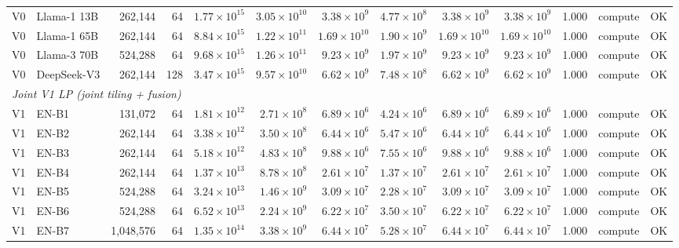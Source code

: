 \begin{table}[ht!]
{\begin{tabular}{llrrrrrrrrrll}
V0 & Llama-1 13B & 262{,}144 &  64 & $1.77\times10^{15}$ & $3.05\times10^{10}$ & $3.38\times10^{9}$ & $4.77\times10^{8}$ & $3.38\times10^{9}$ & $3.38\times10^{9}$ & 1.000 & compute & OK \\
V0 & Llama-1 65B & 262{,}144 &  64 & $8.84\times10^{15}$ & $1.22\times10^{11}$ & $1.69\times10^{10}$& $1.90\times10^{9}$ & $1.69\times10^{10}$& $1.69\times10^{10}$& 1.000 & compute & OK \\
V0 & Llama-3 70B & 524{,}288 &  64 & $9.68\times10^{15}$ & $1.26\times10^{11}$ & $9.23\times10^{9}$ & $1.97\times10^{9}$ & $9.23\times10^{9}$ & $9.23\times10^{9}$ & 1.000 & compute & OK \\
V0 & DeepSeek-V3 & 262{,}144 & 128 & $3.47\times10^{15}$ & $9.57\times10^{10}$ & $6.62\times10^{9}$ & $7.48\times10^{8}$ & $6.62\times10^{9}$ & $6.62\times10^{9}$ & 1.000 & compute & OK \\
\midrule
\multicolumn{13}{l}{\textit{Joint V1 LP (joint tiling + fusion)}} \\
\midrule
V1 & EN-B1       &    131{,}072 &  64 & $1.81\times10^{12}$ & $2.71\times10^{8}$  & $6.89\times10^{6}$ & $4.24\times10^{6}$ & $6.89\times10^{6}$ & $6.89\times10^{6}$ & 1.000 & compute & OK \\
V1 & EN-B2       &    262{,}144 &  64 & $3.38\times10^{12}$ & $3.50\times10^{8}$  & $6.44\times10^{6}$ & $5.47\times10^{6}$ & $6.44\times10^{6}$ & $6.44\times10^{6}$ & 1.000 & compute & OK \\
V1 & EN-B3       &    262{,}144 &  64 & $5.18\times10^{12}$ & $4.83\times10^{8}$  & $9.88\times10^{6}$ & $7.55\times10^{6}$ & $9.88\times10^{6}$ & $9.88\times10^{6}$ & 1.000 & compute & OK \\
V1 & EN-B4       &    262{,}144 &  64 & $1.37\times10^{13}$ & $8.78\times10^{8}$  & $2.61\times10^{7}$ & $1.37\times10^{7}$ & $2.61\times10^{7}$ & $2.61\times10^{7}$ & 1.000 & compute & OK \\
V1 & EN-B5       &    524{,}288 &  64 & $3.24\times10^{13}$ & $1.46\times10^{9}$  & $3.09\times10^{7}$ & $2.28\times10^{7}$ & $3.09\times10^{7}$ & $3.09\times10^{7}$ & 1.000 & compute & OK \\
V1 & EN-B6       &    524{,}288 &  64 & $6.52\times10^{13}$ & $2.24\times10^{9}$  & $6.22\times10^{7}$ & $3.50\times10^{7}$ & $6.22\times10^{7}$ & $6.22\times10^{7}$ & 1.000 & compute & OK \\
V1 & EN-B7       & 1{,}048{,}576 &  64 & $1.35\times10^{14}$ & $3.38\times10^{9}$  & $6.44\times10^{7}$ & $5.28\times10^{7}$ & $6.44\times10^{7}$ & $6.44\times10^{7}$ & 1.000 & compute & OK \\

\end{tabular}}
\end{table}
